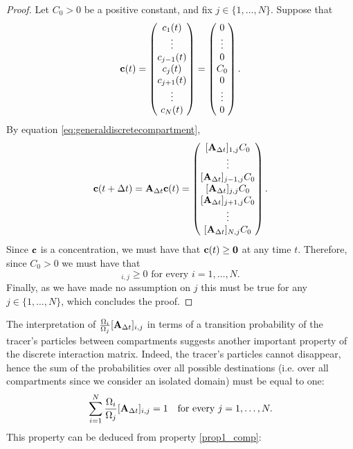 \begin{proof}
	Let $C_0 > 0$ be a positive constant, and fix $j \in \{1,\dots,N\}$. Suppose that 
	\begin{equation}
		\mathbf c(t) = \begin{pmatrix} c_1(t) \\ \vdots \\ c_{j-1}(t) \\ c_j(t) \\ c_{j+1}(t) \\ \vdots \\ c_N(t) \end{pmatrix}
				= \begin{pmatrix} 0 \\ \vdots \\ 0 \\ C_0 \\ 0 \\ \vdots \\ 0 \end{pmatrix}.
	\end{equation}
	By equation \eqref{eq:generaldiscretecompartment},
	\begin{equation}
		\b c(t+\Delta t) = \b A_{\Delta t} \b c(t) = \begin{pmatrix} [\b A_{\Delta t}]_{1,j} C_0 \\ \vdots \\ [\b A_{\Delta t}]_{j-1,j}C_0  \\ [\b A_{\Delta t}]_{j,j} C_0 \\ [\b A_{\Delta t}]_{j+1,j}C_0 \\ \vdots \\ [\b A_{\Delta t}]_{N,j} C_0 \end{pmatrix}.
	\end{equation}
	Since $\mathbf c$ is a concentration, we must have that $\mathbf c(t) \ge \mathbf 0$ at any time $t$. Therefore, since $C_0 > 0$ we must have that
	\begin{equation}
		[\b A_{\Delta t}]_{i,j} \ge 0 \mbox{ for every } i = 1,\dots,N.
	\end{equation}
	Finally, as we have made no assumption on $j$ this must be true for any $j \in \{1,\dots,N\}$, which concludes the proof.
\end{proof}
The interpretation of $\frac{\Omega_i}{\Omega_j}[\mathbf A_{\Delta t}]_{i,j}$ in terms of a transition probability of the tracer's particles between compartments suggests another important property of the discrete interaction matrix. Indeed, the tracer's particles cannot disappear, hence the sum of the probabilities over all possible destinations (i.e. over all compartments since we consider an isolated domain) must be equal to one:
\begin{equation}
	\sum_{i=1}^N \frac{\Omega_i}{\Omega_j}[\mathbf A_{\Delta t}]_{i,j} = 1 \quad \mbox{for every } j=1,\dots,N.
\end{equation}
This property can be deduced from property \ref{prop1_comp}:

